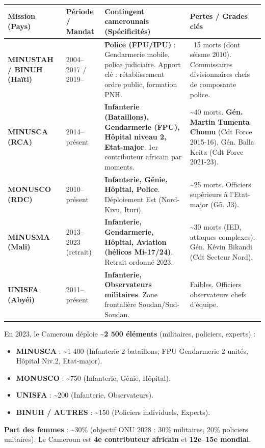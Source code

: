 \documentclass[11pt]{article}
\begin{document}
\begin{center}
\begin{tabularx}{\linewidth}{|l|X|X|X|}\hline
\textbf{Mission (Pays)} & \textbf{Période / Mandat} & \textbf{Contingent camerounais (Spécificités)} & \textbf{Pertes / Grades clés} \\ \hline
\textbf{MINUSTAH / BINUH (Haïti)} & 2004--2017 / 2019-- & \textbf{Police (FPU/IPU)} : Gendarmerie mobile, police judiciaire. Apport clé : rétablissement ordre public, formation PNH. & ~15 morts (dont séisme 2010). Commissaires divisionnaires chefs de composante police. \\ \hline
\textbf{MINUSCA (RCA)} & 2014--présent & \textbf{Infanterie (Bataillons), Gendarmerie (FPU), Hôpital niveau 2, Etat-major}. 1er contributeur africain par moments. & \textasciitilde 40 morts. \textbf{Gén. Martin Tumenta Chomu} (Cdt Force 2015-16), Gén. Balla Keita (Cdt Force 2021-23). \\ \hline
\textbf{MONUSCO (RDC)} & 2010--présent & \textbf{Infanterie, Génie, Hôpital, Police}. Déploiement Est (Nord-Kivu, Ituri). & \textasciitilde 25 morts. Officiers supérieurs à l'Etat-major (G5, J3). \\ \hline
\textbf{MINUSMA (Mali)} & 2013--2023 (retrait) & \textbf{Infanterie, Gendarmerie, Hôpital, Aviation (hélicos Mi-17/24)}. Retrait ordonné 2023. & \textasciitilde 30 morts (IED, attaques complexes). Gén. Kévin Bikandi (Cdt Secteur Nord). \\ \hline
\textbf{UNISFA (Abyéi)} & 2011--présent & \textbf{Infanterie, Observateurs militaires}. Zone frontalière Soudan/Sud-Soudan. & Faibles. Officiers observateurs chefs d'équipe. \\ \hline
\end{tabularx}
\end{center}

\begin{exemplebox}
En 2023, le Cameroun déploie \textbf{\textasciitilde 2 500 éléments} (militaires, policiers, experts) :
\begin{itemize}
    \item \textbf{MINUSCA} : \textasciitilde 1 400 (Infanterie 2 bataillons, FPU Gendarmerie 2 unités, Hôpital Niv.2, Etat-major).
    \item \textbf{MONUSCO} : \textasciitilde 750 (Infanterie, Génie, Hôpital).
    \item \textbf{UNISFA} : \textasciitilde 200 (Infanterie, Observateurs).
    \item \textbf{BINUH / AUTRES} : \textasciitilde 150 (Policiers individuels, Experts).
\end{itemize}
\textbf{Part des femmes} : \textasciitilde 30\% (objectif ONU 2028 : 30\% militaires, 20\% policiers unitaires). Le Cameroun est \textbf{4e contributeur africain} et \textbf{12e--15e mondial}.
\end{exemplebox}
\end{document}
